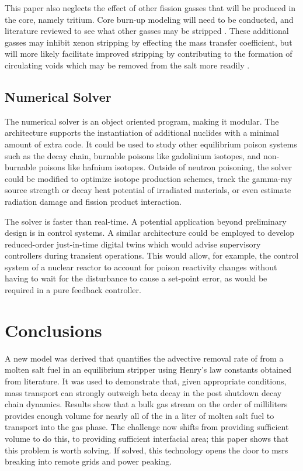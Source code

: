 This paper also neglects the effect of other fission gasses that will be produced in the core, namely tritium. Core burn-up modeling will need to be conducted, and literature reviewed to see what other gasses may be stripped \cite{Offgas}. These additional gasses may inhibit xenon stripping by effecting the mass transfer coefficient, but will more likely facilitate improved stripping by contributing to the formation of circulating voids which may be removed from the salt more readily \cite{XeMSR}. 

\subsection{Numerical Solver}
The numerical solver is an object oriented program, making it modular. The architecture supports the instantiation of additional nuclides with a minimal amount of extra code. It could be used to study other equilibrium poison systems such as the \Sm decay chain, burnable poisons like gadolinium isotopes, and non-burnable poisons like hafnium isotopes. Outside of neutron poisoning, the solver could be modified to optimize isotope production schemes, track the gamma-ray source strength or decay heat potential of irradiated materials, or even estimate radiation damage and fission product interaction.

The solver is faster than real-time. A potential application beyond preliminary design is in control systems. A similar architecture could be employed to develop reduced-order just-in-time digital twins which would advise supervisory controllers during transient operations. This would allow, for example, the control system of a nuclear reactor to account for poison reactivity changes without having to wait for the disturbance to cause a set-point error, as would be required in a pure feedback controller.



\section{Conclusions} \label{sec-sum}
A new model was derived that quantifies the advective removal rate of \Xe from a molten salt fuel in an equilibrium stripper using Henry's law constants obtained from literature. It was used to demonstrate that, given appropriate conditions, mass transport can strongly outweigh beta decay in the post shutdown \Xe decay chain dynamics. Results show that a bulk gas stream on the order of milliliters provides enough volume for nearly all of the \Xe in a liter of molten salt fuel to transport into the gas phase. The challenge now shifts from providing sufficient volume to do this, to providing sufficient interfacial area; this paper shows that this problem is worth solving. If solved, this technology opens the door to \acsp{msr} breaking into remote grids and power peaking.


